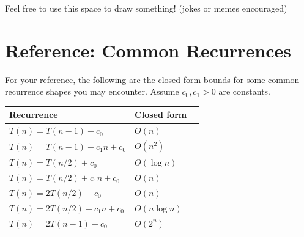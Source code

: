\documentclass[addpoints,12pt]{exam}
\begin{document}
\vspace{\fill}

\begin{center}
  Feel free to use this space to draw something! (jokes or memes encouraged)

  \vspace{10pt}

  \fbox{\rule{6in}{0pt}\rule[-0.5ex]{0pt}{2.5in}}
\end{center}


\newpage


\section*{Reference: Common Recurrences}

For your reference, the following are the closed-form bounds for some
common recurrence shapes you may encounter. Assume $c_0, c_1 > 0$ are
constants.

\vspace{1em}

\begin{center}
  \renewcommand{\arraystretch}{1.6}
  \begin{tabular}{|l|l|l|}
    \hline
    \textbf{Recurrence} & \textbf{Closed form} \\
    \hline
    $T(n) = T(n-1) + c_0$               & $O(n)$           \\
    \hline
    $T(n) = T(n-1) + c_1n + c_0$              & $O(n^2)$         \\
    \hline
    $T(n) = T(n/2) + c_0$               & $O(\log n)$      \\
    \hline
    $T(n) = T(n/2) + c_1n + c_0$              & $O(n)$           \\
    \hline
    $T(n) = 2T(n/2) + c_0$              & $O(n)$           \\
    \hline
    $T(n) = 2T(n/2) + c_1n + c_0$             & $O(n \log n)$    \\
    \hline
    $T(n) = 2T(n-1) + c_0$              & $O(2^n)$         \\
    \hline
  \end{tabular}
\end{center}

\vspace{1em}
\end{document}
